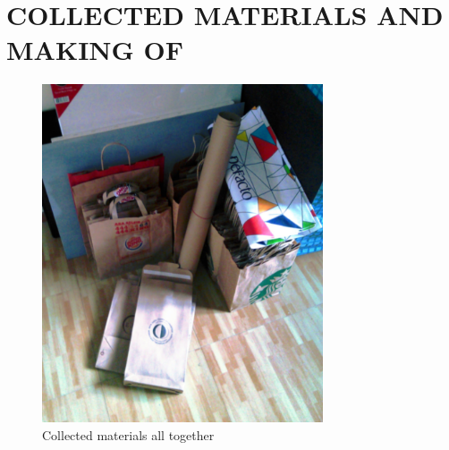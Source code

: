 \chapter{COLLECTED MATERIALS AND MAKING OF}

\begin{figure}[h!]
  \centering
  \includegraphics[height=10cm]{project_graphics/collected_all_together.jpg}
  \caption{Collected materials all together}
  \label{fig:CollectedAllTogether}
\end{figure}


